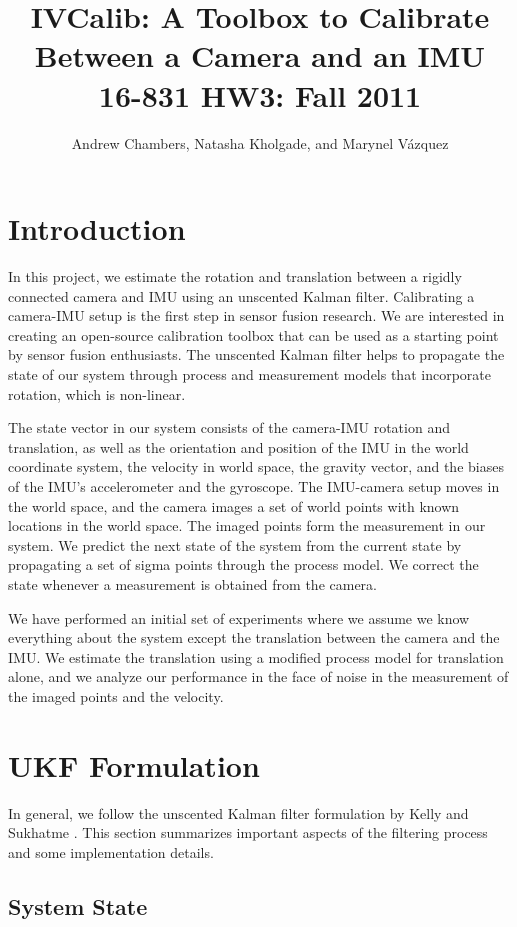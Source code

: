 \documentclass[letterpaper]{article}
\title{
  IVCalib: A Toolbox to Calibrate Between a Camera and an IMU\\
  \Large{16-831 HW3: Fall 2011}
}
\author{Andrew Chambers, Natasha Kholgade, and Marynel V\'azquez}
\date{}
\begin{document}
\maketitle

\section{Introduction}

In this project, we estimate the rotation and translation between a rigidly connected camera and IMU using an unscented Kalman filter. Calibrating a camera-IMU setup is the first step in sensor fusion research. We are interested in creating an open-source calibration toolbox that can be used as a starting point by sensor fusion enthusiasts. The unscented Kalman filter helps to propagate the state of our system through process and measurement models that incorporate rotation, which is non-linear.

The state vector in our system consists of the camera-IMU rotation and translation, as well as the orientation and position of the IMU in the world coordinate system, the velocity in world space, the gravity vector, and the biases of the IMU's accelerometer and the gyroscope. The IMU-camera setup moves in the world space, and the camera images a set of world points with known locations in the world space. The imaged points form the measurement in our system. We predict the next state of the system from the current state by propagating a set of sigma points through the process model. We correct the state whenever a measurement is obtained from the camera.

We have performed an initial set of experiments where we assume we know everything about the system except the translation between the camera and the IMU. We estimate the translation using a modified process model for translation alone, and we analyze our performance in the face of noise in the measurement of the imaged points and the velocity.

\section{UKF Formulation}
\label{sec:UKF}

In general, we follow the unscented Kalman filter formulation by Kelly
and Sukhatme \cite{2011:kelly:article}. This section 
summarizes important aspects of the filtering process and some
implementation details.

\subsection{System State}
\end{document}
